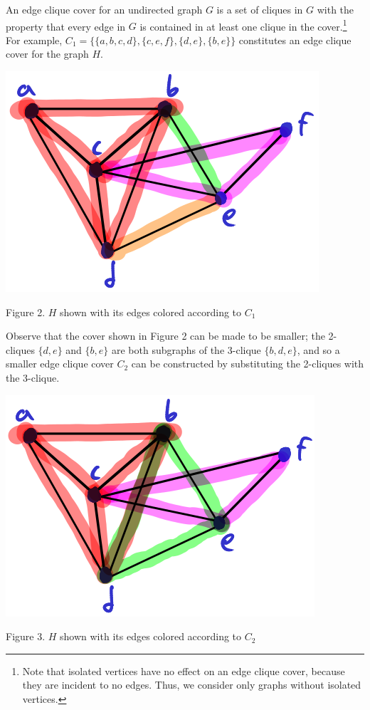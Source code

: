 \documentclass[12pt]{article}
\begin{document}
    An edge clique cover for an undirected graph $G$ is a set of cliques in $G$ with the property that every edge in $G$ is contained in at least one clique in the cover.\footnote{Note that isolated vertices have no effect on an edge clique cover, because they are incident to no edges. Thus, we consider only graphs without isolated vertices.}
    For example, $C_1 = \{\{a, b, c, d\}, \{c, e, f\}, \{d, e\}, \{b, e\}\}$ constitutes an edge clique cover for the graph $H$.
    \begin{center}
        \includegraphics[scale=.6]{fig2.png}

        Figure 2. $H$ shown with its edges colored according to $C_1$
    \end{center}

    Observe that the cover shown in Figure 2 can be made to be smaller; the 2-cliques $\{d,e\}$ and $\{b,e\}$ are both subgraphs of the 3-clique $\{b, d, e\}$, and so a smaller edge clique cover $C_2$ can be constructed by substituting the 2-cliques with the 3-clique.
    \begin{center}
        \includegraphics[scale=.6]{fig3.png}

        Figure 3. $H$ shown with its edges colored according to $C_2$
    \end{center}
\end{document}
